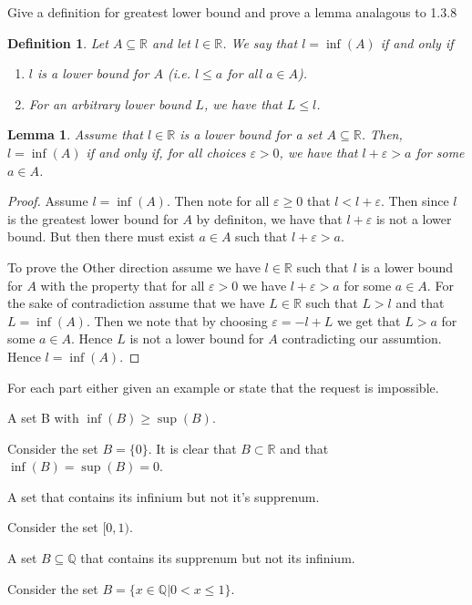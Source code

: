 \documentclass[11pt,largemargins]{homework}
\newcommand{\R}{\mathbb{R}}
\newcommand{\Q}{\mathbb{Q}}
\newcommand{\eps}{\varepsilon}
\begin{document}
\maketitle

\question
Give a definition for greatest lower bound and prove a lemma analagous to 1.3.8 

\newtheorem{definition}{Definition}
\begin{definition}
    
 Let $A \subseteq \R$ and let $l \in \R$. We say that $l = \inf(A)$ if and only if 
\begin{enumerate}
    \item $l$ is a lower bound for $A$ (i.e. $l \leq a$ for all $a \in A$).
    \item For an arbitrary lower bound $L$, we have that $L \leq l$. 
\end{enumerate}
\end{definition}
\newtheorem{lemma}{Lemma}[definition]
\begin{lemma}
    Assume that $l \in \R$ is a lower bound for a set $A \subseteq \R$. Then, $l = \inf(A)$ if and only if, for all choices $\eps > 0$, we have that 
    $l + \eps > a$ for some $a \in A$. 
\end{lemma}

\begin{proof}
    Assume $l = \inf(A)$. Then note for all $\eps \geq 0$ that $l < l + \eps$. Then since $l$ is the greatest lower bound for $A$
    by definiton, we have that $l + \eps$ is not a lower bound. But then there must exist $a \in A$ such that $l + \eps > a$. 

    To prove the Other direction assume we have $l \in \R$ such that $l$ is a lower bound for $A$ with the property that 
    for all $\eps > 0$ we have $l + \eps > a$ for some $a \in A$. For the sake of contradiction assume that we have $L \in \R$ such that $L > l$ and that $L = \inf(A)$. Then we note that by choosing $\eps = -l + L$
    we get that $L > a$ for some $a \in A$. Hence $L$ is not a lower bound for $A$ contradicting our assumtion. Hence $l = \inf(A)$.  
\end{proof}

\question
For each part either given an example or state that the request is impossible. 

\begin{alphaparts}
    \questionpart
        A set B with $\inf(B) \geq \sup(B)$. 

        Consider the set $B = \{0\}$. It is clear that $B \subset \R$ and that $\inf(B) = \sup(B) = 0$. 

    \questionpart
        A set that contains its infinium but not it's supprenum. 

        Consider the set $[0, 1)$. 

    \questionpart
        A set $B \subseteq \Q$ that contains its supprenum but not its infinium. 

        Consider the set $B = \{x \in \Q | 0 < x \leq 1 \} $. 

\end{alphaparts}
\end{document}
